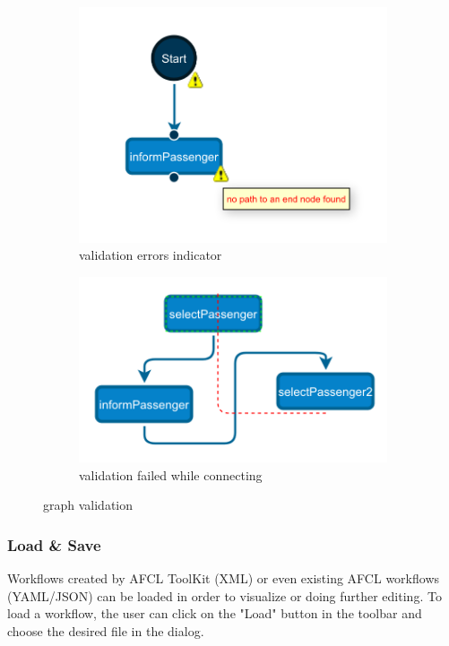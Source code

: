 \documentclass[a4paper,top=25mm,bottom=25mm,12pt,pdftex,halfparskip,twoside,bibtotoc,numbers=noenddot]{scrbook}
\begin{document}
\begin{figure}
\centering
\begin{subfigure}{.4\textwidth}
  \centering
  \includegraphics[width=.8\linewidth]{validate1}
  \caption{validation errors indicator}
\end{subfigure}
\begin{subfigure}{.4\textwidth}
  \centering
  \includegraphics[width=.8\linewidth]{validate2}
  \caption{validation failed while connecting}
\end{subfigure}
\caption{graph validation}
\label{fig:cell-validation}
\end{figure}

\subsubsection{Load \& Save}

Workflows created by AFCL ToolKit (XML) or even existing AFCL workflows (YAML/JSON) can be loaded in order to visualize or doing further editing. To load a workflow, the user can click on the "Load" button in the toolbar and choose the desired file in the dialog.
\end{document}
